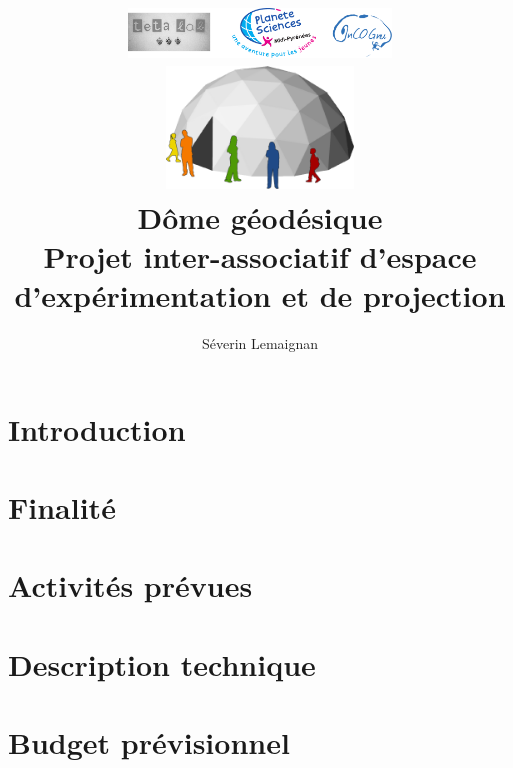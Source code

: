 \documentclass[a4paper,12pt]{book}
\title{
	\includegraphics[width=7cm]{logos.pdf}\\
	\vfill
	\includegraphics[width=5cm]{general.pdf}\\
	\vspace{3em}
	\LARGE{\textbf{Dôme géodésique}}\\[1cm]
	\large{Projet inter-associatif d'espace d'expérimentation et de projection}\\[1cm]
	\vfill
}
\author{
Séverin Lemaignan
}
\begin{document}

\maketitle

\tableofcontents


\chapter{Introduction}

\chapter{Finalité}

\chapter{Activités prévues}

\chapter{Description technique}

\chapter{Budget prévisionnel}
\end{document}
